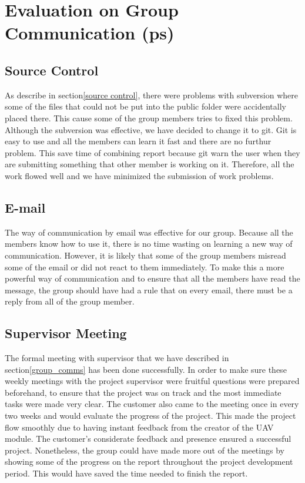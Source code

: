 \section{Evaluation on Group Communication (ps)}
\label{evaluation on group communication}

\subsection{Source Control}
As describe in section\ref{source control}, there were problems with subversion where some of the files that could not be put into the public folder were accidentally placed there.
This cause some of the group members tries to fixed this problem.
Although the subversion was effective, we have decided to change it to git.
Git is easy to use and all the members can learn it fast and there are no furthur problem.
This save time of combining report because git warn the user when they are submitting something that other member is working on it.
Therefore, all the work flowed well and we have minimized the submission of work problems.


\subsection{E-mail}
The way of communication by email was effective for our group.
Because all the members know how to use it, there is no time wasting on learning a new way of communication.
However, it is likely that some of the group members misread some of the email or did not react to them immediately.
To make this a more powerful way of communication and to ensure that all the members have read the message, the group should have had a rule that on every email, there must be a reply from all of the group member.

\subsection{Supervisor Meeting}
The formal meeting with supervisor that we have described in section\ref{group_comms} has been done successfully. 
In order to make sure these weekly meetings with the project supervisor were fruitful questions were prepared beforehand, to ensure that the project was on track and the most immediate tasks were made very clear.
The customer also came to the meeting once in every two weeks and would evaluate the progress of the project.
This made the project flow smoothly due to having instant feedback from the creator of the UAV module.
The customer's considerate feedback and presence ensured a successful project.
Nonetheless, the group could have made more out of the meetings by showing some of the progress on the report  throughout the project development period.
This would have saved the time needed to finish the report.


